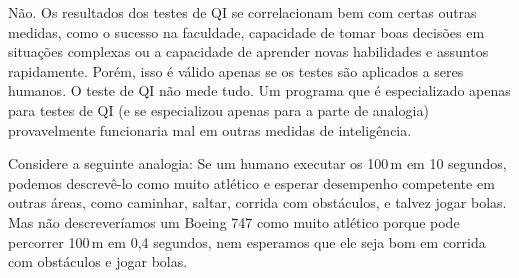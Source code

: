 \begin{solution}
Não. Os resultados dos testes de QI se correlacionam bem com certas outras medidas, como o sucesso na faculdade, capacidade de tomar boas decisões em situações complexas ou a capacidade de aprender novas habilidades e assuntos rapidamente. Porém, isso é válido apenas se os testes são aplicados a seres humanos. O teste de QI não mede tudo. Um programa que é especializado apenas para testes de QI (e se especializou apenas para a parte de analogia) provavelmente funcionaria mal em outras medidas de inteligência.

Considere a seguinte analogia: Se um humano executar os 100\,m em 10 segundos, podemos descrevê-lo como muito atlético e esperar desempenho competente em outras áreas, como caminhar, saltar, corrida com obstáculos, e talvez jogar bolas. Mas não descreveríamos um Boeing 747 como muito atlético porque pode percorrer 100\,m em 0,4 segundos, nem esperamos que ele seja bom em corrida com obstáculos e jogar bolas.
\end{solution}

